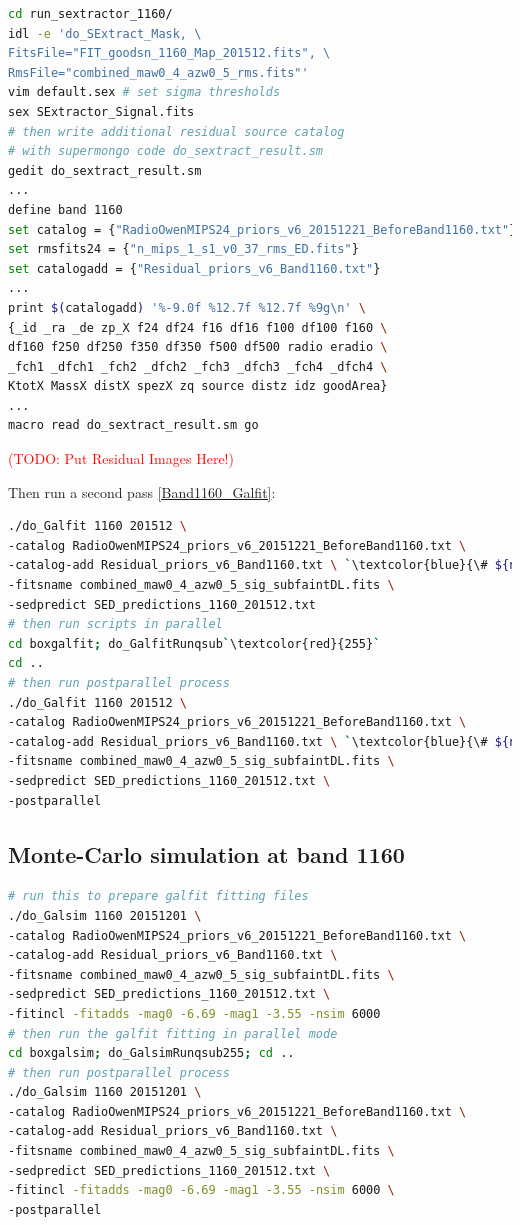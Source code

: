 \documentclass[11pt,a4paper]{article}
\begin{document}
\begin{lstlisting}[language=bash]
cd run_sextractor_1160/
idl -e 'do_SExtract_Mask, \
FitsFile="FIT_goodsn_1160_Map_201512.fits", \
RmsFile="combined_maw0_4_azw0_5_rms.fits"'
vim default.sex # set sigma thresholds
sex SExtractor_Signal.fits
# then write additional residual source catalog
# with supermongo code do_sextract_result.sm
gedit do_sextract_result.sm
...
define band 1160
set catalog = {"RadioOwenMIPS24_priors_v6_20151221_BeforeBand1160.txt"}
set rmsfits24 = {"n_mips_1_s1_v0_37_rms_ED.fits"}
set catalogadd = {"Residual_priors_v6_Band1160.txt"}
...
print $(catalogadd) '%-9.0f %12.7f %12.7f %9g\n' \
{_id _ra _de zp_X f24 df24 f16 df16 f100 df100 f160 \
df160 f250 df250 f350 df350 f500 df500 radio eradio \
_fch1 _dfch1 _fch2 _dfch2 _fch3 _dfch3 _fch4 _dfch4 \
KtotX MassX distX spezX zq source distz idz goodArea}
...
macro read do_sextract_result.sm go
\end{lstlisting}

\textcolor{red}{(TODO: Put Residual Images Here!)}

Then run a second pass \ref{Band1160_Galfit}: 

\begin{lstlisting}[language=bash]
./do_Galfit 1160 201512 \
-catalog RadioOwenMIPS24_priors_v6_20151221_BeforeBand1160.txt \
-catalog-add Residual_priors_v6_Band1160.txt \ `\textcolor{blue}{\# ${new!}$}`
-fitsname combined_maw0_4_azw0_5_sig_subfaintDL.fits \
-sedpredict SED_predictions_1160_201512.txt
# then run scripts in parallel 
cd boxgalfit; do_GalfitRunqsub`\textcolor{red}{255}`
cd ..
# then run postparallel process
./do_Galfit 1160 201512 \
-catalog RadioOwenMIPS24_priors_v6_20151221_BeforeBand1160.txt \
-catalog-add Residual_priors_v6_Band1160.txt \ `\textcolor{blue}{\# ${new!}$}`
-fitsname combined_maw0_4_azw0_5_sig_subfaintDL.fits \
-sedpredict SED_predictions_1160_201512.txt \
-postparallel
\end{lstlisting}

\subsection{Monte-Carlo simulation at band 1160}
\label{Band1160_Galsim}

\begin{lstlisting}[language=bash]
# run this to prepare galfit fitting files
./do_Galsim 1160 20151201 \
-catalog RadioOwenMIPS24_priors_v6_20151221_BeforeBand1160.txt \
-catalog-add Residual_priors_v6_Band1160.txt \
-fitsname combined_maw0_4_azw0_5_sig_subfaintDL.fits \
-sedpredict SED_predictions_1160_201512.txt \
-fitincl -fitadds -mag0 -6.69 -mag1 -3.55 -nsim 6000 
# then run the galfit fitting in parallel mode
cd boxgalsim; do_GalsimRunqsub255; cd ..
# then run postparallel process
./do_Galsim 1160 20151201 \
-catalog RadioOwenMIPS24_priors_v6_20151221_BeforeBand1160.txt \
-catalog-add Residual_priors_v6_Band1160.txt \
-fitsname combined_maw0_4_azw0_5_sig_subfaintDL.fits \
-sedpredict SED_predictions_1160_201512.txt \
-fitincl -fitadds -mag0 -6.69 -mag1 -3.55 -nsim 6000 \
-postparallel
\end{lstlisting}
\end{document}
